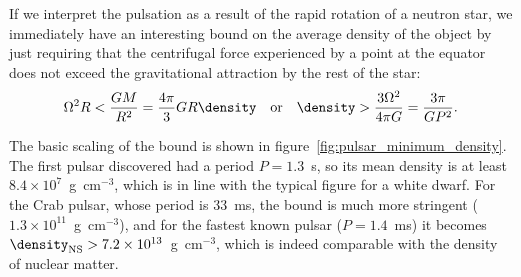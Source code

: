 
If we interpret the pulsation as a result of the rapid rotation of a neutron star,
we immediately have an interesting bound on the average density of the object by
just requiring that the centrifugal force experienced by a point at the equator does
not exceed the gravitational attraction by the rest of the star:
\begin{align}\label{eq:pulsar_minimum_density}
	\Omega^2 R < \frac{GM}{R^2} = \frac{4\pi}{3} G R \density \quad\text{or}\quad
  \density > \frac{3 \Omega^2}{4\pi G} = \frac{3\pi}{GP^2}.
\end{align}

\begin{marginfigure}
  
  \caption{Minimum density of a neutron star as a function of the period
    from~\eqref{eq:pulsar_minimum_density}.}
  \label{fig:pulsar_minimum_density}
\end{marginfigure}

The basic scaling of the bound is shown in figure~\ref{fig:pulsar_minimum_density}.
The first pulsar discovered had a period $P = 1.3$~s, so its mean density is at
least $8.4 \times 10^7$~g~cm$^{-3}$, which is in line with the typical figure for
a white dwarf. For the Crab pulsar, whose period is $33$~ms, the bound is much
more stringent ($1.3 \times 10^{11}$~g~cm$^{-3}$), and for the fastest known pulsar
($P = 1.4$~ms) it becomes $\density_\text{NS} > 7.2 \times 10^{13}$~g~cm$^{-3}$,
which is indeed comparable with the density of nuclear matter.

